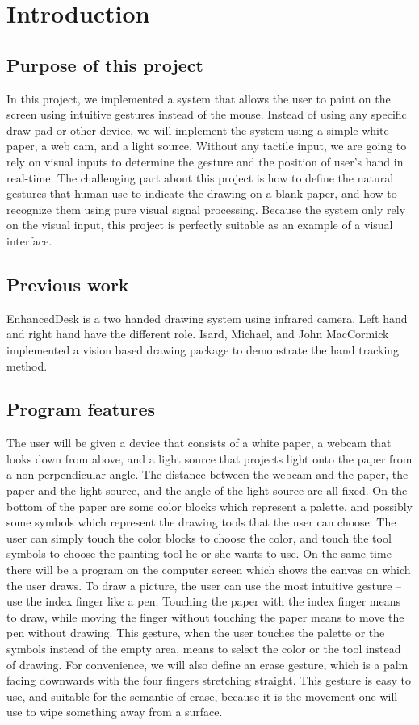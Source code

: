 \section{Introduction}
\subsection{Purpose of this project}
    In this project, we implemented a system that allows the user to paint on the screen using intuitive gestures instead of the mouse. 
    Instead of using any specific draw pad or other device, we will implement the system using a simple white paper, a web cam, and a light source. 
    Without any tactile input, we are going to rely on visual inputs to determine the gesture and the position of user's hand in real-time. 
    The challenging part about this project is how to define the natural gestures that human use to indicate the drawing on a  blank paper, and how to recognize them using pure visual signal processing. Because the system only rely on the visual input, this project is perfectly suitable as an example of a visual interface. 
\subsection{Previous work}
    EnhancedDesk\cite{a} is a two handed drawing system using infrared camera. Left hand and right hand have the different role.  Isard, Michael, and John MacCormick implemented a vision based drawing package to demonstrate the hand tracking method\cite{b}.
\subsection{Program features}
The user will be given a device that consists of a white paper, a webcam that looks down from above, 
and a light source that projects light onto the paper from a non-perpendicular angle.
The distance between the webcam and the paper, the paper and the light source, and the angle of the light source are all fixed. On the bottom of the paper are some color blocks which represent a palette, and possibly some symbols which represent the drawing tools that the user can choose. The user can simply touch the color blocks to choose the color, and touch the tool symbols to choose the painting tool he or she wants to use. On the same time there will be a program on the computer screen which shows the canvas on which the user draws. 
To draw a picture, the user can use the most intuitive gesture -- use the index finger like a pen. 
Touching the paper with the index finger means to draw, while moving the finger without touching the paper means to move the pen without drawing. 
This gesture, when the user touches the palette or the symbols instead of the empty area, means to select the color or the tool instead of drawing. 
For convenience, we will also define an erase gesture, which is a palm facing downwards with the four fingers stretching straight. This gesture is easy to use, and suitable for the semantic of erase, because it is the movement one will use to wipe something away from a surface.
